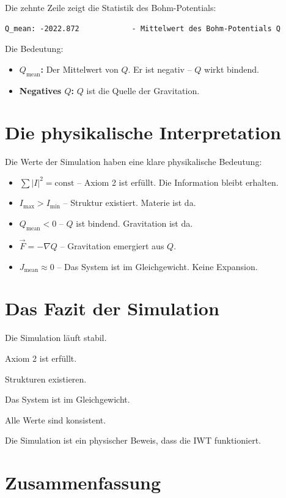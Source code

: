 Die zehnte Zeile zeigt die Statistik des Bohm-Potentials:

\begin{verbatim}
Q_mean: -2022.872            - Mittelwert des Bohm-Potentials Q
\end{verbatim}

Die Bedeutung:

\begin{itemize}
\item \textbf{\( Q_{\text{mean}} \):} Der Mittelwert von \( Q \). Er ist negativ – \( Q \) wirkt bindend.
\item \textbf{Negatives \( Q \):} \( Q \) ist die Quelle der Gravitation.
\end{itemize}

\section{Die physikalische Interpretation}

Die Werte der Simulation haben eine klare physikalische Bedeutung:

\begin{itemize}
\item \( \sum |I|^2 = \text{const} \) – Axiom 2 ist erfüllt. Die Information bleibt erhalten.
\item \( I_{\text{max}} > I_{\text{min}} \) – Struktur existiert. Materie ist da.
\item \( Q_{\text{mean}} < 0 \) – \( Q \) ist bindend. Gravitation ist da.
\item \( \vec{F} = -\nabla Q \) – Gravitation emergiert aus \( Q \).
\item \( J_{\text{mean}} \approx 0 \) – Das System ist im Gleichgewicht. Keine Expansion.
\end{itemize}

\section{Das Fazit der Simulation}

Die Simulation läuft stabil.

Axiom 2 ist erfüllt.

Strukturen existieren.

Das System ist im Gleichgewicht.

Alle Werte sind konsistent.

Die Simulation ist ein physischer Beweis, dass die IWT funktioniert.

\section{Zusammenfassung}

